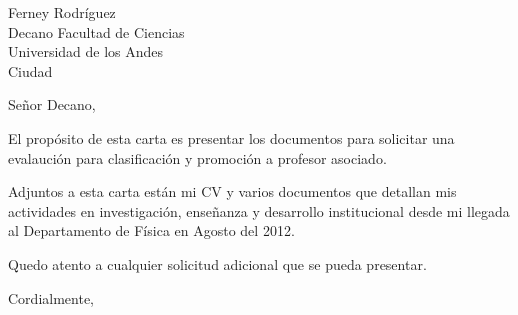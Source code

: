 \documentclass[letterpaper]{scrlttr2}
\begin{document}
\begin{letter}{%
Ferney Rodr\'iguez\\
Decano Facultad de Ciencias\\
Universidad de los Andes\\
Ciudad
}

\opening{Se\~nor Decano,}


El prop\'osito de esta carta es presentar los documentos para
solicitar una evalauci\'on para clasificaci\'on y promoci\'on a
profesor asociado. 

Adjuntos a esta carta est\'an mi CV y varios documentos que detallan mis
actividades en investigaci\'on, ense\~nanza y desarrollo
institucional desde mi llegada al Departamento de F\'isica en Agosto
del 2012. 

Quedo atento a cualquier solicitud adicional que se pueda presentar.

\closing{Cordialmente,}

\end{letter}
\end{document}
